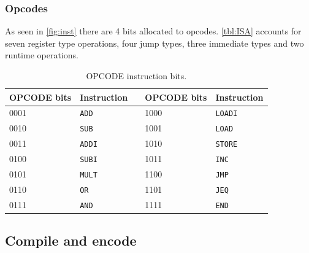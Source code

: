 \documentclass[a4paper, english]{article}
\numberwithin{equation}{section}
\begin{document}
\subsubsection{Opcodes}
As seen in \cref{fig:inst} there are 4 bits allocated to opcodes. \cref{tbl:ISA} accounts for seven register type operations, four jump types, three immediate types and two runtime operations.
\begin{table}[H]
    \centering
    \caption{OPCODE instruction bits.}\label{tbl:opcode}
    \begin{tabular}{lllll}
        \toprule
        OPCODE bits & Instruction   &  & OPCODE bits & Instruction    \\
        \midrule
        0001        & \texttt{ADD}  &  & 1000        & \texttt{LOADI} \\
        0010        & \texttt{SUB}  &  & 1001        & \texttt{LOAD}  \\
        0011        & \texttt{ADDI} &  & 1010        & \texttt{STORE} \\
        0100        & \texttt{SUBI} &  & 1011        & \texttt{INC}   \\
        0101        & \texttt{MULT} &  & 1100        & \texttt{JMP}   \\
        0110        & \texttt{OR}   &  & 1101        & \texttt{JEQ}   \\
        0111        & \texttt{AND}  &  & 1111        & \texttt{END}   \\
        \bottomrule
    \end{tabular}
\end{table}
\subsection{Compile and encode}
\end{document}
